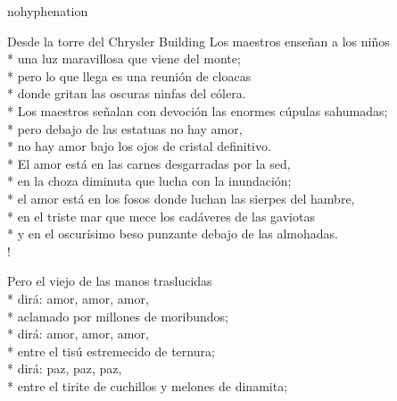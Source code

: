 \documentclass[
    a5paper,
    DIV=10,
    12pt,
    notitlepage,
    oneside,]
{scrbook} %
\begin{document}
\begin{hyphenrules}{nohyphenation}
\begin{poem}{Desde la torre del Chrysler Building}{}{\vspace{-1em}}
Los maestros enseñan a los niños\\*
una luz maravillosa que viene del monte;\\*
pero lo que llega es una reunión de cloacas\\*
donde gritan las oscuras ninfas del cólera.\\*
Los maestros señalan con devoción las enormes cúpulas sahumadas;\\*
pero debajo de las estatuas no hay amor,\\*
no hay amor bajo los ojos de cristal definitivo.\\*
El amor está en las carnes desgarradas por la sed,\\*
en la choza diminuta que lucha con la inundación;\\*
el amor está en los fosos donde luchan las sierpes del hambre,\\*
en el triste mar que mece los cadáveres de las gaviotas\\*
y en el oscurísimo beso punzante debajo de las almohadas.\\!

Pero el viejo de las manos traslucidas\\*
dirá: amor, amor, amor,\\*
aclamado por millones de moribundos;\\*
dirá: amor, amor, amor,\\*
entre el tisú estremecido de ternura;\\*
dirá: paz, paz, paz,\\*
entre el tirite de cuchillos y melones de dinamita;\\


\end{poem}
\end{hyphenrules}
\end{document}
